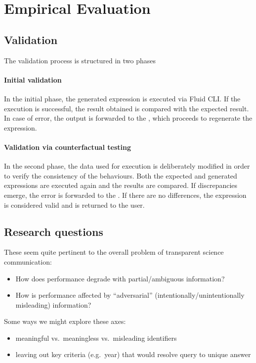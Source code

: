 \section{Empirical Evaluation}
\label{sec:evaluation}

\subsection{Validation}
\label{subsec:validation-with-counterfactual-data}

The validation process is structured in two phases

\paragraph{Initial validation}
In the initial phase, the generated expression is executed via Fluid CLI. If the execution is successful, the
result obtained is compared with the expected result. In case of error, the output is forwarded to the
\InterpretationAgent, which proceeds to regenerate the expression.

\paragraph{Validation via counterfactual testing}
In the second phase, the data used for execution is deliberately modified in order to verify the consistency
of the behaviours. Both the expected and generated expressions are executed again and the results are
compared. If discrepancies emerge, the error is forwarded to the \InterpretationAgent. If there are no
differences, the expression is considered valid and is returned to the user.

\subsection{Research questions}

These seem quite pertinent to the overall problem of transparent science communication:
\begin{itemize}
\item How does performance degrade with partial/ambiguous information?
\item How is performance affected by ``adversarial'' (intentionally/unintentionally misleading) information?
\end{itemize}

Some ways we might explore these axes:
\begin{itemize}
\item meaningful vs.~meaningless vs.~misleading identifiers
\item leaving out key criteria (e.g.~year) that would resolve query to unique answer
\end{itemize}

